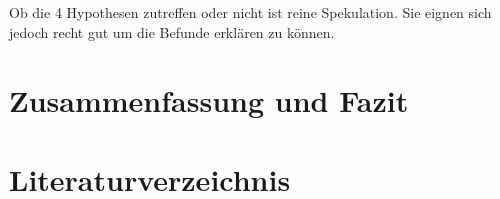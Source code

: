 \documentclass[doc,a4paper,12pt]{apa6}
\begin{document}
Ob die 4 Hypothesen zutreffen oder nicht ist reine Spekulation. Sie eignen sich jedoch recht gut um die Befunde erklären zu können.  

\section{Zusammenfassung und Fazit}

\section{Literaturverzeichnis}

\printbibliography[heading=none]










\end{document}
